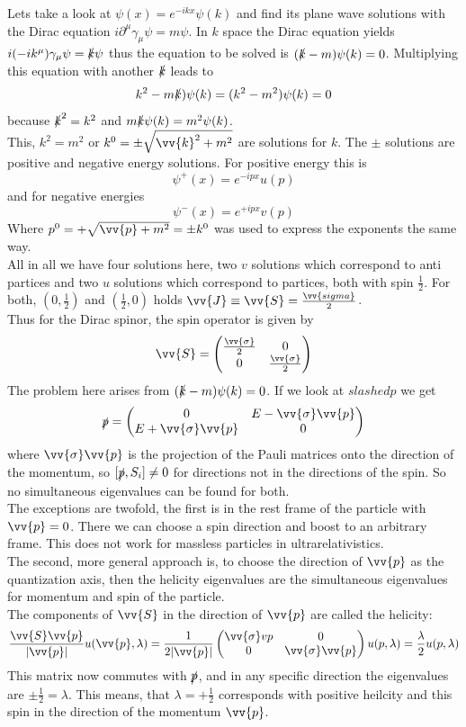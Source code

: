 \documentclass{include/thesisclass}
\newcommand{\vp}{\vv{p}}
\newcommand{\p}{\partial}
\newcommand{\Matz}[4]{\begin{pmatrix}#1&#2\\#3&#4\end{pmatrix}}
\begin{document}
Lets take a look at $\psi(x) = e^{-ikx}\psi(k)$ and find its plane wave solutions with the Dirac equation $i \p^\mu \gamma_\mu \psi = m \psi$. In $k$ space the Dirac equation yields $i (-i k^\mu) \gamma_\mu \psi = \slashed{k} \psi$ thus the equation to be solved is $(\slashed{k} - m) \psi(k) = 0$. Multiplying this equation with another $\slashed{k}$ leads to
\[ k^2 - m \slashed{k}) \psi(k) = (k^2 - m ^2) \psi(k)= 0 \]
because $\slashed{k}^2 = k^2$ and $m\slashed{k}\psi(k) = m^2 \psi(k)$.\\
This, $k^2 = m^2$ or $k^0 = \pm \sqrt{ \vv{k}^2 + m ^2}$ are solutions for $k$. The $\pm$ solutions are positive and negative energy solutions. For positive energy this is
\[\psi^+(x) = e^{-ipx}u(p)\]
and for negative energies
\[ \psi^-(x) = e^{+ipx}v(p)\]
Where $p^0 = + \sqrt{\vv{p} + m^2} = \pm k^0$ was used to express the exponents the same way.\\
All in all we have four solutions here, two $v$ solutions which correspond to anti partices and two $u$ solutions which correspond to partices, both with spin $\frac{1}{2}$. For both, $\left( 0, \frac{1}{2}\right)$ and $\left(\frac{1}{2}, 0\right)$ holds $\vv{J} \equiv \vv{S} = \frac{\vv{sigma}}{2}$.\\
Thus for the Dirac spinor, the spin operator is given by
\[ \vv{S} = \Matz{\frac{\vv{\sigma}}{2}}{0}{0}{\frac{\vv{\sigma}}{2}}\]
The problem here arises from $(\slashed{k} - m)\psi(k) = 0$. If we look at $slashed{p}$ we get
\[ \slashed{p} = \Matz{0}{E - \vv{\sigma}\vv{p}}{E + \vv{\sigma}\vv{p}}{0}\]
where $\vv{\sigma}\vp$ is the projection of the Pauli matrices onto the direction of the momentum, so $[\slashed{p}, S_i]\neq 0$ for directions not in the directions of the spin. So no simultaneous eigenvalues can be found for both.\\
The exceptions are twofold, the first is in the rest frame of the particle with $\vp = 0$. There we can choose a spin direction and boost to an arbitrary frame. This does not work for massless particles in ultrarelativistics.\\
The second, more general approach is, to choose the direction of $\vp$ as the quantization axis, then the helicity eigenvalues are the simultaneous eigenvalues for momentum and spin of the particle.\\
The components of $\vv{S}$ in the direction of $\vp$ are called the helicity:
\[\frac{\vv{S}\vp}{|\vp|} u(\vp, \lambda) = \frac{1}{2|\vp|}\Matz{\vv{\sigma}vp}{0}{0}{\vv{\sigma}\vp}u(p,\lambda) = \frac{\lambda}{2}u(p,\lambda)\]
This matrix now commutes with $\slashed{p}$, and in any specific direction the eigenvalues are $\pm \frac{1}{2} = \lambda$. This means, that $\lambda = + \frac{1}{2}$ corresponds with positive heilcity and this spin in the direction of the momentum $\vp$.\\
\end{document}
